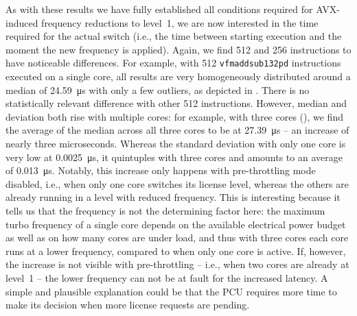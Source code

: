 As with these results we have fully established all conditions required for \gls{AVX}-induced frequency reductions to level~1, we are now interested in the time required for the actual switch (i.e., the time between starting execution and the moment the new frequency is applied). Again, we find \SI[number-unit-product=-]{512}{\bit} and \SI[number-unit-product=-]{256}{\bit} instructions to have noticeable differences. For example, with \SI[number-unit-product=-]{512}{\bit} \texttt{vfmaddsub132pd} instructions executed on a single core, all results are very homogeneously distributed around a median of \SI{24.59}{\micro\second} with only a few outliers, as depicted in . There is no statistically relevant difference with other \SI[number-unit-product=-]{512}{\bit} instructions. However, median and deviation both rise with multiple cores: for example, with three cores (), we find the average of the median across all three cores to be at \SI{27.39}{\micro\second} -- an increase of nearly three microseconds. Whereas the standard deviation with only one core is very low at \SI{0.0025}{\micro\second}, it quintuples with three cores and amounts to an average of \SI{0.013}{\micro\second}. Notably, this increase only happens with pre-throttling mode disabled, i.e., when only one core switches its license level, whereas the others are already running in a level with reduced frequency. This is interesting because it tells us that the frequency is not the determining factor here: the maximum turbo frequency of a single core depends on the available electrical power budget as well as on how many cores are under load, and thus with three cores each core runs at a lower frequency, compared to when only one core is active. If, however, the increase is not visible with pre-throttling -- i.e., when two cores are already at level~1 -- the lower frequency can not be at fault for the increased latency. A simple and plausible explanation could be that the \gls{PCU} requires more time to make its decision when more license requests are pending.

